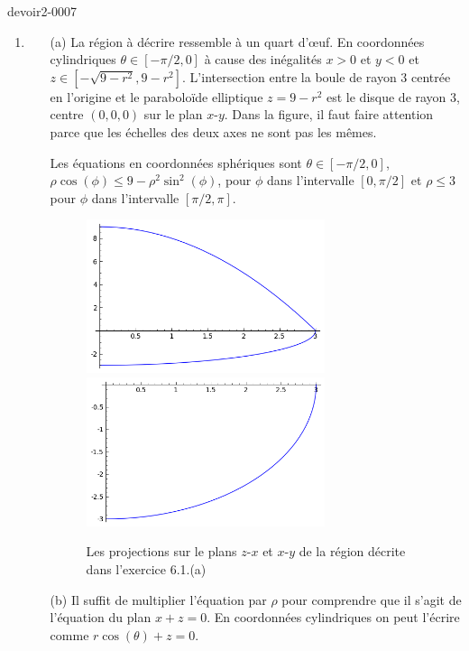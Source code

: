 \begin{corrige}{devoir2-0007}
  \begin{enumerate}
  \item 
    \begin{enumerate}
    \item[(a)] La région à décrire ressemble à un quart d'œuf. En coordonnées cylindriques $\theta\in [-\pi/2, 0]$ à cause des inégalités $x>0$ et $y<0$ et $z\in [-\sqrt{9-r^2}, 9-r^2]$. L'intersection entre la  boule de rayon $3$ centrée en l'origine et le paraboloïde elliptique $z=9-r^2$ est le disque de  rayon $3$, centre $(0,0,0)$ sur le plan $x$-$y$. Dans la figure, il faut faire attention parce que les échelles des deux axes ne sont pas les mêmes. 

      Les équations en coordonnées sphériques sont $\theta\in [-\pi/2, 0]$, $\rho\cos(\phi)\leq 9- \rho^2\sin^2(\phi)$, pour $\phi$ dans l'intervalle $[0, \pi/2]$ et $\rho\leq 3$ pour  $\phi$ dans l'intervalle $[\pi/2, \pi]$.
 \begin{figure}
  \begin{center}
    \includegraphics[width=7cm]{Fig_exo6devoir2premiere.png}
    \includegraphics[width=7cm]{Fig_exo6devoir2premiere_a.png} 

  \caption{Les projections sur le plans $z$-$x$ et $x$-$y$ de la région décrite dans l'exercice 6.1.(a)}\label{exo6devoir2}
  \end{center}
 
  \end{figure}
    \item[(b)] Il suffit de multiplier l'équation par $\rho$ pour comprendre que il s'agit de l'équation du plan $x+z=0$. En coordonnées cylindriques on peut l'écrire comme $r\cos(\theta)+z=0$. 
    \end{enumerate}


\end{enumerate}
\end{corrige}
